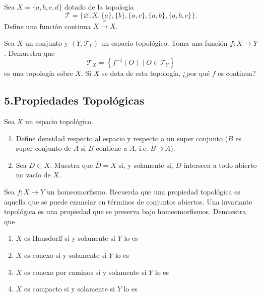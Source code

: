 \documentclass[b5paper,10pt,twoside]{book}
\begin{document}
\begin{problem}
Sea $X = \{a, b, c, d\}$ dotado de la topología
\[
\mathcal{T} = \{\varnothing, X, \{a\}, \{b\}, \{a, c\}, \{a, b\}, \{a, b, c\}\}.
\]
Define una función continua \(X\xrightarrow{\varphi} X\).
\end{problem}


\begin{problem}
Sea \(X\) un conjunto y 
\((Y,\mathcal{T}_Y)\) un espacio topológico.
Toma una función \(f\colon X\to Y\).
Demuestra que 
\[
\mathcal{T}_X = \left\{ 
    f^{-1}(O) \mid O\in \mathcal{T}_Y
 \right\}
\]
es una topología sobre \(X\).
Si \(X\) se dota de esta topología,
¿por qué \(f\) es continua?
\end{problem}








\subsection*{5.\enspace Propiedades Topológicas}



\begin{problem}
Sea \(X\)  un espacio topológico.
\begin{enumerate}[label=(\roman*)]
\item Define densidad respecto al espacio y respecto a un super conjunto (\(B\) es super conjunto de \(A\) si \(B\) contiene a \(A\), i.e. \(B\supset A\)).
\item Sea   \(D\subset X\). Muestra que \(\overline{D} = X\) si, y solamente si, \(D\) interseca a todo abierto no vacío de \(X\).
\end{enumerate}



\end{problem}

\begin{problem}
Sea \(f\colon X\to Y\)
un homeomorfismo.
Recuerda que una propiedad topológica es aquella que se puede enunciar en términos de 
conjuntos abiertos.
Una invariante topológica 
es una propiedad que se preserva bajo homeomorfismos.
Demuestra que 
\begin{enumerate}[label=(\roman*)]
\item  \(X\) es Hausdorff si y solamente si  \(Y\) lo es
\item  \(X\) es conexo si y solamente si  \(Y\) lo es
\item  \(X\) es conexo por caminos si y solamente si  \(Y\) lo es
\item  \(X\) es compacto si y solamente si  \(Y\) lo es
\end{enumerate}
\end{problem}
\end{document}
